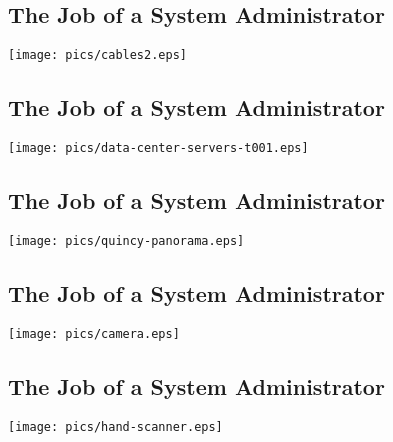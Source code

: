 \documentclass[xga]{xdvislides}
\begin{document}
\subsection{The Job of a System Administrator}
\vspace*{\fill}
\begin{center}
	\texttt{[image: pics/cables2.eps]} \\
\end{center}
\vspace*{\fill}

\subsection{The Job of a System Administrator}
\vspace*{\fill}
\begin{center}
	\texttt{[image: pics/data-center-servers-t001.eps]} \\
\end{center}
\vspace*{\fill}

\subsection{The Job of a System Administrator}
\vspace*{\fill}
\begin{center}
	\texttt{[image: pics/quincy-panorama.eps]} \\
\end{center}
\vspace*{\fill}

\subsection{The Job of a System Administrator}
\vspace*{\fill}
\begin{center}
	\texttt{[image: pics/camera.eps]} \\
\end{center}
\vspace*{\fill}

\subsection{The Job of a System Administrator}
\vspace*{\fill}
\begin{center}
	\texttt{[image: pics/hand-scanner.eps]} \\
\end{center}
\vspace*{\fill}
\end{document}
